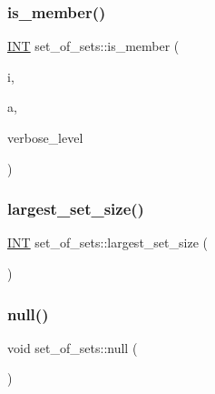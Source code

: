 \mbox{\label{classset__of__sets_a141f3da201152cb143216fe3d5d7fe89}} 
\subsubsection{\texorpdfstring{is\+\_\+member()}{is\_member()}}
{\footnotesize\ttfamily \mbox{\hyperlink{galois_8h_a09fddde158a3a20bd2dcadb609de11dc}{I\+NT}} set\+\_\+of\+\_\+sets\+::is\+\_\+member (\begin{DoxyParamCaption}\item[{\mbox{\hyperlink{galois_8h_a09fddde158a3a20bd2dcadb609de11dc}{I\+NT}}}]{i,  }\item[{\mbox{\hyperlink{galois_8h_a09fddde158a3a20bd2dcadb609de11dc}{I\+NT}}}]{a,  }\item[{\mbox{\hyperlink{galois_8h_a09fddde158a3a20bd2dcadb609de11dc}{I\+NT}}}]{verbose\+\_\+level }\end{DoxyParamCaption})}

\mbox{\label{classset__of__sets_a1132e0c3351bf61684c0eff88f40ace8}} 
\subsubsection{\texorpdfstring{largest\+\_\+set\+\_\+size()}{largest\_set\_size()}}
{\footnotesize\ttfamily \mbox{\hyperlink{galois_8h_a09fddde158a3a20bd2dcadb609de11dc}{I\+NT}} set\+\_\+of\+\_\+sets\+::largest\+\_\+set\+\_\+size (\begin{DoxyParamCaption}{ }\end{DoxyParamCaption})}

\mbox{\label{classset__of__sets_a0781046b5156beb68e73fc3794df0b57}} 
\subsubsection{\texorpdfstring{null()}{null()}}
{\footnotesize\ttfamily void set\+\_\+of\+\_\+sets\+::null (\begin{DoxyParamCaption}{ }\end{DoxyParamCaption})}

